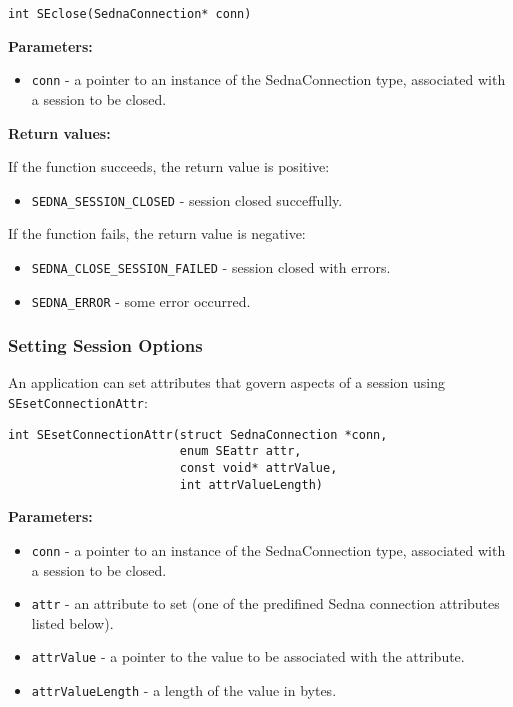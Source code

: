\documentclass[a4paper,12pt]{article}
\newenvironment{citemize}
{\begin{itemize}
  \setlength{\itemsep}{0pt}
  \setlength{\parskip}{0pt}
  \setlength{\parsep}{0pt}}
{\end{itemize}}
\begin{document}
\begin{verbatim}
int SEclose(SednaConnection* conn)
\end{verbatim}

\noindent
\textbf{Parameters:}

\begin{citemize}
\item\verb!conn! - a pointer to an instance of the SednaConnection type,
associated with a session to be closed.
\end{citemize}

\noindent
\textbf{Return values:}

\medskip

\noindent
If the function succeeds, the return value is positive:

\begin{citemize}
\item\verb!SEDNA_SESSION_CLOSED! - session closed succeffully.
\end{citemize}

\noindent
If the function fails, the return value is negative:

\begin{citemize}
\item\verb!SEDNA_CLOSE_SESSION_FAILED! - session closed with errors.
\item\verb!SEDNA_ERROR! - some error occurred.
\end{citemize}


\subsubsection{Setting Session Options}
\label{session-option-capi}

An application can set attributes that govern aspects of a session using
\verb!SEsetConnectionAttr!:

\begin{verbatim}
int SEsetConnectionAttr(struct SednaConnection *conn,
                        enum SEattr attr,
                        const void* attrValue,
                        int attrValueLength)
\end{verbatim}

\noindent
\textbf{Parameters:}

\begin{citemize}
\item\verb!conn! - a pointer to an instance of the SednaConnection type,
associated with a session to be closed.
\item\verb!attr! - an attribute to set (one of the predifined Sedna connection
attributes listed below).
\item\verb!attrValue! - a pointer to the value to be associated with the
attribute.
\item\verb!attrValueLength! - a length of the value in bytes.
\end{citemize}
\end{document}
